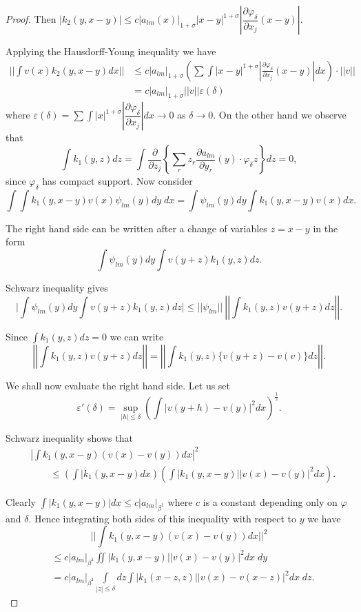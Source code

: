 \begin{proof}
Then $|k_2 (y, x-y)| \leq c| a_{lm}(x)|_{1 + \sigma} |x-y|^{1+ \sigma}
\left|\dfrac{\partial \varphi_\delta}{\partial x_j}(x-y)\right|$. 

Applying the Hausdorff-Young inequality we have
{\fontsize{10pt}{12pt}\selectfont
\begin{align*}
||\int v (x) k_2 (y,x-y) dx || & \leq c | a_{lm} |_{1+\sigma} \left(\sum \int
|x-y|^{1+\sigma}\left| \frac{\partial \varphi_\delta}{\partial x_j} (x-y)
\right| dx\right) \cdot ||v|| \\
& = c|a_{lm} |_{1+\sigma}||v|| \varepsilon (\delta )
\tag {5.29} \label{chap3-eq5.29}
\end{align*}}\pageoriginale
where $\varepsilon (\delta) = \sum \int |x|^{1+\sigma}\left|
\dfrac{\partial \varphi_\delta}{\partial x_j} \right| dx \rightarrow 0$ as
$\delta \rightarrow 0$.  
On the other hand we observe that 
$$
\int k_1 (y,z) dz = \int \frac{\partial}{\partial z_j} \left\{ \sum
\limits_{r} z_r \frac{\partial a_{lm}}{\partial
    y_r}(y) \cdot  \varphi_\delta z \right\}dz = 0, 
$$
since $\varphi_\delta$ has compact support. Now consider 
$$
\int \int k_1 (y, x-y) v (x) \psi_{lm} (y) dy \; dx  = \int
\psi_{lm} (y) dy \int k_1 (y, x-y) v (x) dx. 
$$ 

The right hand side can be written after a change of variables $z=
x-y$ in the form  
$$
\int \psi_{lm} (y) dy \int v (y+z) k_1 (y, z) dz.
$$

Schwarz inequality gives 
$$
\big| \int \psi_{lm}(y) dy \int v (y+z) k_1 (y,z) dz \big| \leq ||
\psi_{lm} || ~\left|\left| \int k_1 (y,z) v (y+z) dz \right|\right|. 
$$ 

Since $\int k_1 (y, z) dz = 0$ we can write
$$
\left|\left|\int k_1 (y, z) v (y+z) dz \right|\right| = \left|\left|
\int k_1 (y,z) \big\{ v (y+z) - v (v)\big\} dz \right|\right|.  
$$

We shall now evaluate the right hand side. Let us set  
$$
\varepsilon' (\delta) = \sup\limits_{|h|\leq \delta} \left(\int |v(y  + h)
- v(y) |^2 dx\right)^{\frac{1}{2}}. 
$$

Schwarz inequality shows that 
\begin{align*}
&\left| \int k_1 (y, x-y) (v(x) - v(y)) dx \right|^2\\
&\qquad \leq \left(\int |
k_1 (y, x-y) dx \right) \left(\int | k_1 (y, x-y) || v (x)-v(y)|^2
dx\right). 
\end{align*}\pageoriginale

Clearly $\int |k_1 (y, x- y) | dx \leq c| a_{lm}|_{\beta^1}$ where
$c$ is a constant depending only on $\varphi$ and $\delta$. Hence
integrating both sides of this inequality with respect to $y$ we have  
$$
|| \int k_1 (y, x-y) (v(x) - v(y)) dx ||^2
$$
\begin{align*}
& \leq c|a_{lm}|_{\beta^1} \iint |k_1 (y, x-y) || v(x) - v(y)|^2 dx \;dy\\ 
& =  c|a_{lm}|_{\beta^1} \int\limits_{|z| \leq \delta} dz \int
  |k_1 (x-z,z) || v(x) - v (x-z)|^2  dx\; dz. 
\end{align*}


\end{proof}
